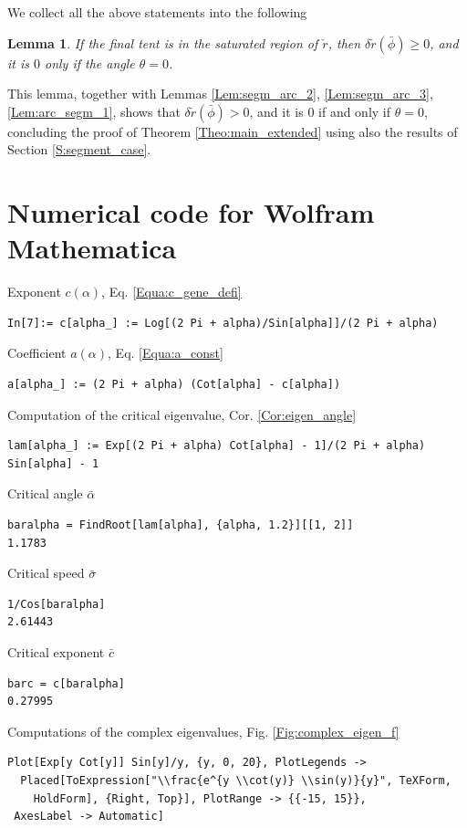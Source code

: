 \documentclass[reqno]{amsart}
\theoremstyle{definition} \newtheorem{definition}{Definition}[section]
\theoremstyle{definition} \newtheorem{remark}[definition]{Remark}
\theoremstyle{plain} \newtheorem{lemma}[definition]{Lemma}
\theoremstyle{plain} \newtheorem{proposition}[definition]{Proposition}
\theoremstyle{plain} \newtheorem{theorem}[definition]{Theorem}
\theoremstyle{plain} \newtheorem{corollary}[definition]{Corollary}
\theoremstyle{definition} \newtheorem{example}[definition]{Example}
\theoremstyle{plain} \newtheorem{claim}[clai]{Claim}
\theoremstyle{definition} \newtheorem{assumption}[definition]{Assumption}
\theoremstyle{definition} \newtheorem{observation}[definition]{Observation}
\newcommand{\1}{\mathbbm 1}
\numberwithin{equation}{section} %
\theoremstyle{plain} \newtheorem*{theorem*}{Theorem}
\theoremstyle{plain} \newtheorem{mthm}[maintheorem]{Main Theorem}
\theoremstyle{plain} \newtheorem*{mthm*}{Main Theorem}
\theoremstyle{plain} \newtheorem*{conjecture*}{Conjecture}
\theoremstyle{plain} \newtheorem{conjecture}[definition]{Conjecture}
\theoremstyle{plain} \newtheorem*{problem*}{Problem}
\begin{document}
We collect all the above statements into the following

\begin{lemma}
\label{Lem:arc_segm_satur}
If the final tent is in the saturated region of $\check r$, then $\delta \check r(\bar \phi) \geq 0$, and it is $0$ only if the angle $\theta = 0$.
\end{lemma}

This lemma, together with Lemmas \ref{Lem:segm_arc_2}, \ref{Lem:segm_arc_3}, \ref{Lem:arc_segm_1}, shows that $\delta \check r(\bar \phi) > 0$, and it is $0$ if and only if $\theta = 0$, concluding the proof of Theorem \ref{Theo:main_extended} using also the results of Section \ref{S:segment_case}.




\newpage

\appendix


\section{Numerical code for Wolfram Mathematica}
\label{S:num_code}



\bigskip

\noindent Exponent $c(\alpha)$, Eq. \eqref{Equa:c_gene_defi}
\medskip
\begin{verbatim}
In[7]:= c[alpha_] := Log[(2 Pi + alpha)/Sin[alpha]]/(2 Pi + alpha)
\end{verbatim}
\medskip
Coefficient $a(\alpha)$, Eq. \eqref{Equa:a_const}
\medskip
\begin{verbatim}
a[alpha_] := (2 Pi + alpha) (Cot[alpha] - c[alpha])
\end{verbatim}
\medskip
Computation of the critical eigenvalue, Cor. \ref{Cor:eigen_angle}
\medskip
\begin{verbatim}
lam[alpha_] := Exp[(2 Pi + alpha) Cot[alpha] - 1]/(2 Pi + alpha) Sin[alpha] - 1
\end{verbatim}
\medskip
Critical angle $\bar \alpha$
\medskip
\begin{verbatim}
baralpha = FindRoot[lam[alpha], {alpha, 1.2}][[1, 2]]
1.1783
\end{verbatim}
\medskip
Critical speed $\bar \sigma$
\medskip
\begin{verbatim}
1/Cos[baralpha]
2.61443
\end{verbatim}
\medskip
Critical exponent $\bar c$
\medskip
\begin{verbatim}
barc = c[baralpha]
0.27995
\end{verbatim}
\medskip
Computations of the complex eigenvalues, Fig. \ref{Fig:complex_eigen_f}
\medskip
\begin{verbatim}
Plot[Exp[y Cot[y]] Sin[y]/y, {y, 0, 20}, PlotLegends -> 
  Placed[ToExpression["\\frac{e^{y \\cot(y)} \\sin(y)}{y}", TeXForm, 
    HoldForm], {Right, Top}], PlotRange -> {{-15, 15}}, 
 AxesLabel -> Automatic]
\end{verbatim}
\end{document}
